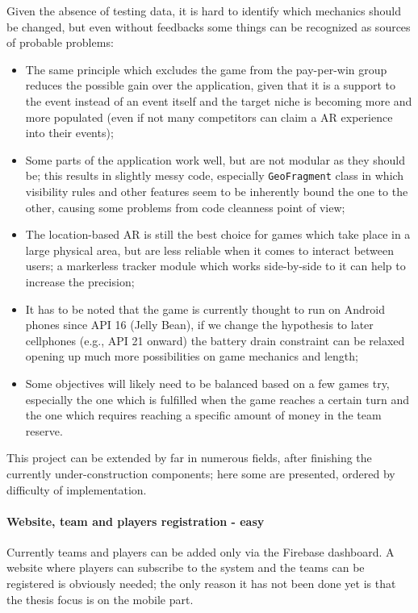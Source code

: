 	Given the absence of testing data, it is hard to identify which mechanics should be changed, but even without feedbacks some things can be recognized as sources of probable problems:
	\begin{itemize}
		\item The same principle which excludes the game from the pay-per-win group reduces the possible gain over the application, given that it is a support to the event instead of an event itself and the target niche is becoming more and more populated (even if not many competitors can claim a AR experience into their events);
		\item Some parts of the application work well, but are not modular as they should be; this results in slightly messy code, especially \lstinline|GeoFragment| class in which visibility rules and other features seem to be inherently bound the one to the other, causing some problems from code cleanness point of view;
		\item The location-based AR is still the best choice for games which take place in a large physical area, but are less reliable when it comes to interact between users; a markerless tracker module which works side-by-side to it can help to increase the precision;
		\item It has to be noted that the game is currently thought to run on Android phones since API 16 (Jelly Bean), if we change the hypothesis to later cellphones (e.g., API 21 onward) the battery drain constraint can be relaxed opening up much more possibilities on game mechanics and length;
		\item Some objectives will likely need to be balanced based on a few games try, especially the one which is fulfilled when the game reaches a certain turn and the one which requires reaching a specific amount of money in the team reserve.
	\end{itemize}
	
	This project can be extended by far in numerous fields, after finishing the currently under-construction components; here some are presented, ordered by difficulty of implementation.
	
	\paragraph{Website, team and players registration - easy}
		
	Currently teams and players can be added only via the Firebase dashboard. A website where players can subscribe to the system and the teams can be registered is obviously needed; the only reason it has not been done yet is that the thesis focus is on the mobile part.
	

